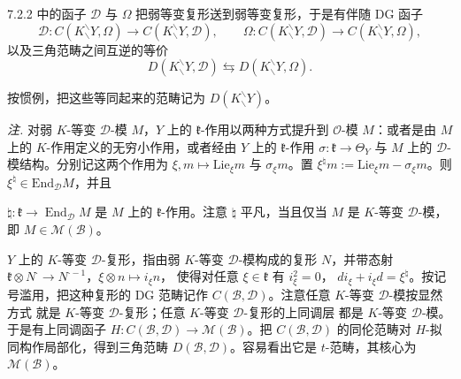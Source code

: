 7.2.2 中的函子 $\mathcal{D}$ 与 $\Omega$ 把弱等变复形送到弱等变复形，于是有伴随 DG 函子
\begin{equation}\tag{320}
\mathcal{D}:C(K^{\backslash}_{\backslash}Y,\Omega)\to C(K^{\backslash}_{\backslash}Y,\mathcal{D}),\qquad
\Omega:C(K^{\backslash}_{\backslash}Y,\mathcal{D})\to C(K^{\backslash}_{\backslash}Y,\Omega),
\end{equation}
以及三角范畴之间互逆的等价
\begin{equation}\tag{321}
D(K^{\backslash}_{\backslash}Y,\mathcal{D})\leftrightarrows D(K^{\backslash}_{\backslash}Y,\Omega).
\end{equation}

按惯例，把这些等同起来的范畴记为 $D(K^{\backslash}_{\backslash}Y)$。

 \emph{注.} 对弱 $K$-等变 $\mathcal{D}$-模 $M$，$Y$ 上的 $\mathfrak{k}$-作用以两种方式提升到 $\mathcal{O}$-模 $M$：或者是由 $M$ 上的 $K$-作用定义的无穷小作用，或者经由 $Y$ 上的 $\mathfrak{k}$-作用 $\sigma:\mathfrak{k}\to\Theta_{Y}$ 与 $M$ 上的 $\mathcal{D}$-模结构。分别记这两个作用为 $\xi,m\mapsto\mathrm{Lie}_{\xi}m$ 与 $\sigma_{\xi}m$。置 $\xi^{\natural}m:=\mathrm{Lie}_{\xi}m-\sigma_{\xi}m$。则 $\xi^{\natural}\in\mathrm{End}_{\mathcal{D}}M$，并且



$\natural:\mathfrak{k}\to\operatorname{End}_{\mathcal{D}}M$ 是 $M$ 上的
$\mathfrak{k}$-作用。注意 $\natural$ 平凡，当且仅当 $M$ 是 $K$-等变
$\mathcal{D}$-模，即 $M\in\mathcal{M}(\mathcal{B})$。

 $Y$ 上的 $K$-等变 $\mathcal{D}$-复形，指由弱 $K$-等变
$\mathcal{D}$-模构成的复形 $N$，并带态射
$\mathfrak{k}\otimes N^{\cdot}\to N^{\cdot-1}$，$\xi\otimes n\mapsto i_\xi n$，
使得对任意 $\xi\in\mathfrak{k}$ 有 $i_\xi^2=0$，
$di_\xi+i_\xi d=\xi^{\natural}$。按记号滥用，把这种复形的 DG 范畴记作
$C(\mathcal{B},\mathcal{D})$。注意任意 $K$-等变 $\mathcal{D}$-模按显然方式
就是 $K$-等变 $\mathcal{D}$-复形；任意 $K$-等变 $\mathcal{D}$-复形的上同调层
都是 $K$-等变 $\mathcal{D}$-模。于是有上同调函子
$H:C(\mathcal{B},\mathcal{D})\to\mathcal{M}(\mathcal{B})$。把
$C(\mathcal{B},\mathcal{D})$ 的同伦范畴对 $H$-拟同构作局部化，得到三角范畴
$D(\mathcal{B},\mathcal{D})$。容易看出它是 $t$-范畴，其核心为
$\mathcal{M}(\mathcal{B})$。

